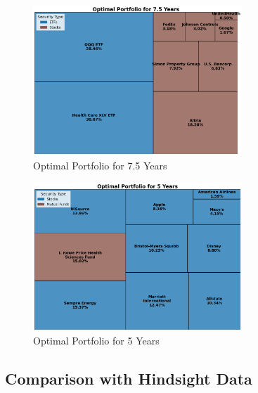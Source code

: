 \begin{figure}[!htbp]
    \centering
    \includegraphics[width=0.7\textwidth]{../Figures/optimal_portfolio_7_5_years.png}
    \caption{Optimal Portfolio for 7.5 Years}
    \label{fig:optimal_portfolio_7_5y}
\end{figure}
\FloatBarrier

\begin{figure}[!htbp]
    \centering
    \includegraphics[width=0.7\textwidth]{../Figures/optimal_portfolio_5_years.png}
    \caption{Optimal Portfolio for 5 Years}
    \label{fig:optimal_portfolio_5y}
\end{figure}
\FloatBarrier

\subsection{Comparison with Hindsight Data}

